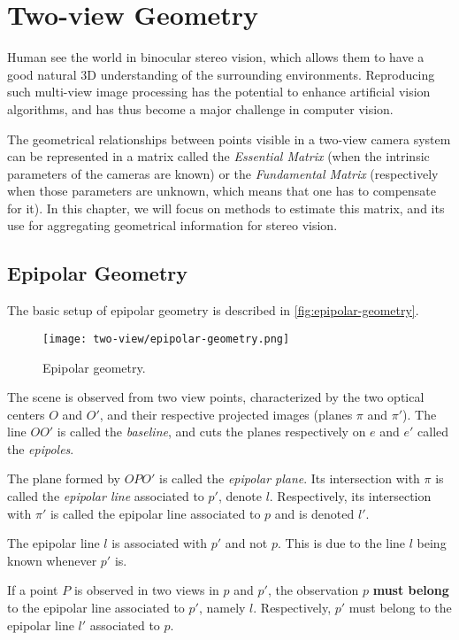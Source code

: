 \section{Two-view Geometry}
Human see the world in binocular stereo vision, which allows them to have a good natural 3D understanding of the surrounding environments. Reproducing such multi-view image processing has the potential to enhance artificial vision algorithms, and has thus become a major challenge in computer vision.

The geometrical relationships between points visible in a two-view camera system can be represented in a matrix called the \emph{Essential Matrix} (when the intrinsic parameters of the cameras are known) or the \emph{Fundamental Matrix} (respectively when those parameters are unknown, which means that one has to compensate for it). In this chapter, we will focus on methods to estimate this matrix, and its use for aggregating geometrical information for stereo vision.

\subsection{Epipolar Geometry}
The basic setup of epipolar geometry is described in \autoref{fig:epipolar-geometry}.
\begin{figure}[H]
    \centering
    \texttt{[image: two-view/epipolar-geometry.png]}
    \caption{Epipolar geometry.}
    \label{fig:epipolar-geometry}
\end{figure}
The scene is observed from two view points, characterized by the two optical centers $O$ and $O'$, and their respective projected images (planes $\pi$ and $\pi'$). The line $OO'$ is called the \emph{baseline}, and cuts the planes respectively on $e$ and $e'$ called the \emph{epipoles}. 

The plane formed by $OPO'$ is called the \emph{epipolar plane}. Its intersection with $\pi$ is called the \emph{epipolar line} associated to $p'$, denote $l$. Respectively, its intersection with $\pi'$ is called the epipolar line associated to $p$ and is denoted $l'$.

\begin{remark}
    The epipolar line $l$ is associated with $p'$ and not $p$. This is due to the line $l$ being known whenever $p'$ is.
\end{remark}

\begin{theorem}
    \label{thm:epipolar-constraint}
    If a point $P$ is observed in two views in $p$ and $p'$, the observation $p$ \textbf{must belong} to the epipolar line associated to $p'$, namely $l$. Respectively, $p'$ must belong to the epipolar line $l'$ associated to $p$.
\end{theorem}

